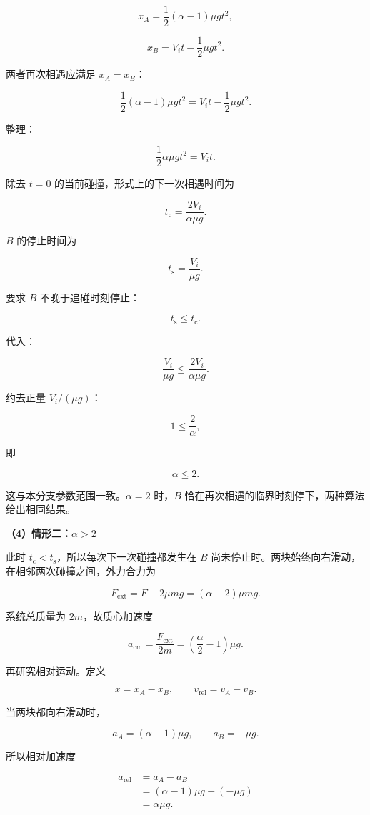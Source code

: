 \documentclass[12pt,a4paper,UTF8]{ctexart}
\begin{document}
\[x_A=\frac12(\alpha-1)\mu gt^2,\]

\[x_B=V_it-\frac12\mu gt^2.\]

两者再次相遇应满足 \(x_A=x_B\)：

\[\frac12(\alpha-1)\mu gt^2
=V_it-\frac12\mu gt^2.\]

整理：

\[\frac12\alpha\mu gt^2=V_it.\]

除去 \(t=0\) 的当前碰撞，形式上的下一次相遇时间为

\[t_{\mathrm c}=\frac{2V_i}{\alpha\mu g}.\]

\(B\) 的停止时间为

\[t_{\mathrm s}=\frac{V_i}{\mu g}.\]

要求 \(B\) 不晚于追碰时刻停止：

\[t_{\mathrm s}\leq t_{\mathrm c}.\]

代入：

\[\frac{V_i}{\mu g}
\leq\frac{2V_i}{\alpha\mu g}.\]

约去正量 \(V_i/(\mu g)\)：

\[1\leq\frac2\alpha,\]

即

\[\alpha\leq2.\]

这与本分支参数范围一致。\(\alpha=2\) 时，\(B\)
恰在再次相遇的临界时刻停下，两种算法给出相同结果。

\textbf{（4）情形二：\(\alpha>2\)}

此时 \(t_{\mathrm c}<t_{\mathrm s}\)，所以每次下一次碰撞都发生在 \(B\)
尚未停止时。两块始终向右滑动，在相邻两次碰撞之间，外力合力为

\[F_{\mathrm{ext}}=F-2\mu mg=(\alpha-2)\mu mg.\]

系统总质量为 \(2m\)，故质心加速度

\[a_{\mathrm{cm}}
=\frac{F_{\mathrm{ext}}}{2m}
=\left(\frac{\alpha}{2}-1\right)\mu g.\]

再研究相对运动。定义

\[x=x_A-x_B,\qquad v_{\mathrm{rel}}=v_A-v_B.\]

当两块都向右滑动时，

\[a_A=(\alpha-1)\mu g,\qquad a_B=-\mu g.\]

所以相对加速度

\[\begin{aligned}
a_{\mathrm{rel}}
&=a_A-a_B\\
&=(\alpha-1)\mu g-(-\mu g)\\
&=\alpha\mu g.
\end{aligned}\]
\end{document}
